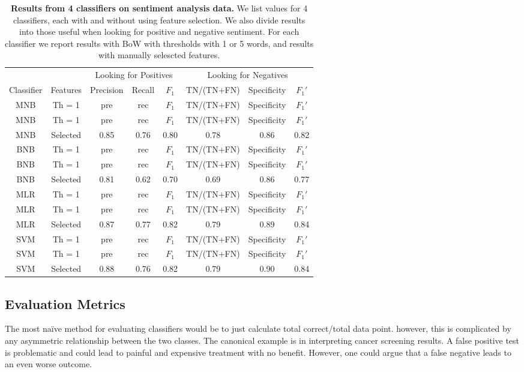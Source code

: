 \documentclass{article} %
\begin{document}
	\begin{table}[h]
		\centering
		\begin{tabular}[]{@{}|c|c|c|c|c|c|c|c|@{}}
			\hline
			\multicolumn{2}{|c|}{} & \multicolumn{3}{c}{Looking for Positives} & \multicolumn{3}{c|}{Looking for Negatives} \\
			\cline{3-8}
			Classifier& Features& Precision& Recall& $F_1$& TN/(TN+FN)& Specificity & $F_1'$ \\
			\hline
			\hline
			MNB & Th = 1  & pre & rec & $F_1$& TN/(TN+FN)& Specificity & $F_1'$ \\
			MNB & Th = 1  & pre & rec & $F_1$& TN/(TN+FN)& Specificity & $F_1'$ \\
			MNB & Selected & 0.85 & 0.76 & 0.80& 0.78& 0.86 & 0.82 \\
			BNB & Th = 1  & pre & rec & $F_1$& TN/(TN+FN)& Specificity & $F_1'$ \\
			BNB & Th = 1  & pre & rec & $F_1$& TN/(TN+FN)& Specificity & $F_1'$ \\
			BNB & Selected & 0.81 & 0.62 & 0.70& 0.69& 0.86 & 0.77 \\
			MLR & Th = 1  & pre & rec & $F_1$& TN/(TN+FN)& Specificity & $F_1'$ \\
			MLR & Th = 1  & pre & rec & $F_1$& TN/(TN+FN)& Specificity & $F_1'$ \\
			MLR & Selected & 0.87 & 0.77 & 0.82& 0.79& 0.89 & 0.84 \\
			SVM & Th = 1  & pre & rec & $F_1$& TN/(TN+FN)& Specificity & $F_1'$ \\
			SVM & Th = 1  & pre & rec & $F_1$& TN/(TN+FN)& Specificity & $F_1'$ \\
			SVM & Selected & 0.88 & 0.76 & 0.82& 0.79& 0.90 & 0.84 \\
			\hline
		\end{tabular}
		\caption{{\bf Results from 4 classifiers on sentiment analysis data.} We list values for 4 classifiers, each with and without using feature selection. We also divide results into those useful when looking for positive and negative sentiment. For each classifier we report results with BoW with thresholds with 1 or 5 words, and results with manually selescted features.}
		\label{tab:results}
	\end{table}
	
	\subsection{Evaluation Metrics}
	
	The most na\"ive method for evaluating classifiers would be to just calculate total correct/total data point. however, this is complicated by any asymmetric relationship between the two classes. The canonical example is in interpreting cancer screening results. A false positive test is problematic and could lead to painful and expensive treatment with no benefit. However, one could argue that a false negative leads to an even worse outcome. 
	
\end{document}
